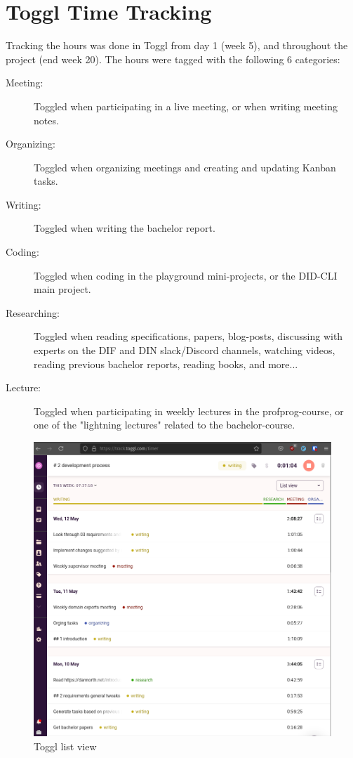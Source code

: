 \section{Toggl Time Tracking}

Tracking the hours was done in Toggl from day 1 (week 5), and throughout the project (end week 20). The hours were tagged with the following 6 categories:

\begin{description}
    \item[Meeting:] Toggled when participating in a live meeting, or when writing meeting notes.
    \item[Organizing:] Toggled when organizing meetings and creating and updating Kanban tasks.
    \item[Writing:] Toggled when writing the  bachelor report.
    \item[Coding:] Toggled when coding in the playground mini-projects, or the DID-CLI main project.
    \item[Researching:] Toggled when reading specifications, papers, blog-posts, discussing with experts on the DIF and DIN slack/Discord channels, watching videos, reading previous bachelor reports, reading books, and more...
    \item[Lecture:] Toggled when participating in weekly lectures in the profprog-course, or one of the "lightning lectures" related to the bachelor-course.
\end{description}


    \begin{figure}[htbp]
      \centering
      \includegraphics[width=.75\textwidth]{figures/toggl-list-view.png}
      \caption[]{Toggl list view}
    \end{figure}
    
